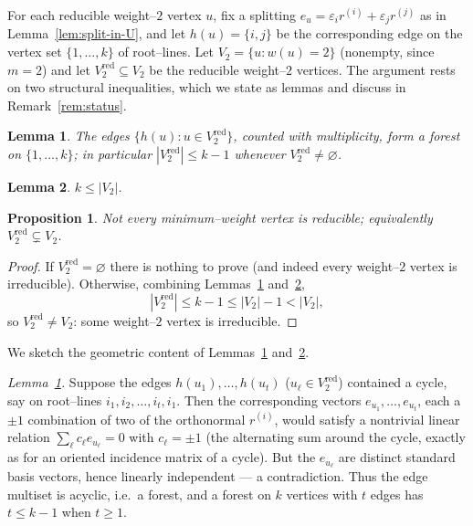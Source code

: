 \documentclass{article}
\newtheorem{lemma}{Lemma}
\newtheorem{proposition}{Proposition}
\theoremstyle{definition}
\begin{document}
For each reducible weight--$2$ vertex $u$, fix a splitting
$e_u=\varepsilon_i r^{(i)}+\varepsilon_j r^{(j)}$ as in
Lemma~\ref{lem:split-in-U}, and let $h(u)=\{i,j\}$ be the corresponding edge on
the vertex set $\{1,\dots,k\}$ of root--lines.  Let
$V_2=\{u:w(u)=2\}$ (nonempty, since $m=2$) and let
$V_2^{\mathrm{red}}\subseteq V_2$ be the reducible weight--$2$ vertices.  The
argument rests on two structural inequalities, which we state as lemmas and
discuss in Remark~\ref{rem:status}.

\begin{lemma}\label{lem:forest}
The edges $\{h(u):u\in V_2^{\mathrm{red}}\}$, counted with multiplicity, form a
forest on $\{1,\dots,k\}$; in particular
$|V_2^{\mathrm{red}}|\leq k-1$ whenever $V_2^{\mathrm{red}}\neq\varnothing$.
\end{lemma}

\begin{lemma}\label{lem:kbound}
$k\leq |V_2|$.
\end{lemma}

\begin{proposition}\label{prop:notall}
Not every minimum--weight vertex is reducible; equivalently
$V_2^{\mathrm{red}}\subsetneq V_2$.
\end{proposition}

\begin{proof}
If $V_2^{\mathrm{red}}=\varnothing$ there is nothing to prove (and indeed every
weight--$2$ vertex is irreducible).  Otherwise, combining
Lemmas~\ref{lem:forest} and~\ref{lem:kbound},
\[
|V_2^{\mathrm{red}}|\leq k-1\leq |V_2|-1<|V_2| ,
\]
so $V_2^{\mathrm{red}}\neq V_2$: some weight--$2$ vertex is irreducible.
\end{proof}

We sketch the geometric content of Lemmas~\ref{lem:forest}
and~\ref{lem:kbound}.

\emph{Lemma~\ref{lem:forest}.}  Suppose the edges $h(u_1),\dots,h(u_t)$
($u_\ell\in V_2^{\mathrm{red}}$) contained a cycle, say on root--lines
$i_1,i_2,\dots,i_t,i_1$.  Then the corresponding vectors
$e_{u_1},\dots,e_{u_t}$, each a $\pm1$ combination of two of the orthonormal
$r^{(i)}$, would satisfy a nontrivial linear relation
$\sum_\ell c_\ell e_{u_\ell}=0$ with $c_\ell=\pm1$ (the alternating sum around
the cycle, exactly as for an oriented incidence matrix of a cycle).  But the
$e_{u_\ell}$ are distinct standard basis vectors, hence linearly independent ---
a contradiction.  Thus the edge multiset is acyclic, i.e.\ a forest, and a
forest on $k$ vertices with $t$ edges has $t\leq k-1$ when $t\geq1$.
\end{document}
